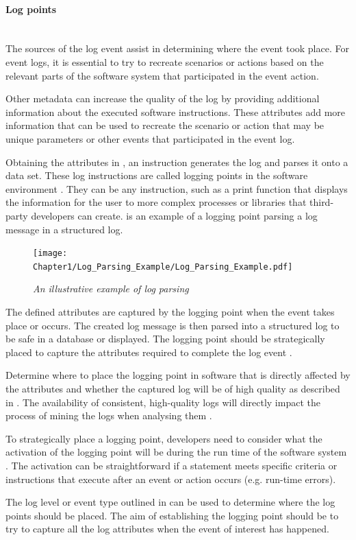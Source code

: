 \paragraph{Log points}\leavevmode\\
The sources of the log event assist in determining where the event took place. For event logs, it is essential to try to recreate scenarios or actions based on the relevant parts of the software system that participated in the event action.\par Other metadata can increase the quality of the log by providing additional information about the executed software instructions. These attributes add more information that can be used to recreate the scenario or action that may be unique parameters or other events that participated in the event log.\par Obtaining the attributes in , an instruction generates the log and parses it onto a data set. These log instructions are called logging points in the software environment \cite{Pecchia2015, Zhu2015}. They can be any instruction, such as a print function that displays the information for the user to more complex processes or libraries that third-party developers can create.  is an example of a logging point parsing a log message in a structured log. 

\clearpage

\begin{figure}[!htb]
	\centering %
	\texttt{[image: Chapter1/Log\_Parsing\_Example/Log\_Parsing\_Example.pdf]}
	\caption[An illustrative example of log parsing]
	{\textit{An illustrative example of log parsing \cite{Zhu2019}}} \label{fig:ch1_logParsing}
\end{figure}

The defined attributes are captured by the logging point when the event takes place or occurs. The created log message is then parsed into a structured log to be safe in a database or displayed. The logging point should be strategically placed to capture the attributes required to complete the log event \cite{Fedaghi2010}.\par Determine where to place the logging point in software that is directly affected by the attributes and whether the captured log will be of high quality as described in . The availability of consistent, high-quality logs will directly impact the process of mining the logs when analysing them \cite{Kherbouche2017}. \par To strategically place a logging point, developers need to consider what the activation of the logging point will be during the run time of the software system \cite{Pecchia2015, Cinque2013}. The activation can be straightforward if a statement meets specific criteria or instructions that execute after an event or action occurs (e.g. run-time errors). \par The log level or event type outlined in  can be used to determine where the log points should be placed. The aim of establishing the logging point should be to try to capture all the log attributes when the event of interest has happened.

